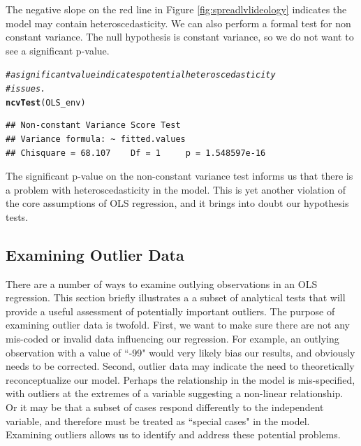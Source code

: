 \documentclass[11pt,openany]{book}\usepackage[]{graphicx}\usepackage[]{color}
\makeatletter
\newcommand{\hlcom}[1]{\textcolor[rgb]{0.678,0.584,0.686}{\textit{#1}}}%
\newcommand{\hlstd}[1]{\textcolor[rgb]{0.345,0.345,0.345}{#1}}%
\newcommand{\hlkwd}[1]{\textcolor[rgb]{0.737,0.353,0.396}{\textbf{#1}}}%
\newenvironment{kframe}{%
 \def\at@end@of@kframe{}%
 \ifinner\ifhmode%
  \def\at@end@of@kframe{\end{minipage}}%
  \begin{minipage}{\columnwidth}%
 \fi\fi%
 \def\FrameCommand##1{\hskip\@totalleftmargin \hskip-\fboxsep
 \colorbox{shadecolor}{##1}\hskip-\fboxsep
     \hskip-\linewidth \hskip-\@totalleftmargin \hskip\columnwidth}%
 \MakeFramed {\advance\hsize-\width
   \@totalleftmargin\z@ \linewidth\hsize
   \@setminipage}}%
 {\par\unskip\endMakeFramed%
 \at@end@of@kframe}
\newenvironment{knitrout}{}{} %
\renewenvironment{knitrout}{\begin{singlespace}}{\end{singlespace}}
\makeatother
\begin{document}
The negative slope on the red line in Figure \ref{fig:spreadlvlideology} indicates the model may contain heteroscedasticity.  We can also perform  a formal test for non constant variance.  The null hypothesis is constant variance, so we do not want to see a significant p-value.

\begin{knitrout}
\color{fgcolor}\begin{kframe}
\begin{alltt}
\hlcom{# a significant value indicates potential heteroscedasticity}
\hlcom{# issues.}
\hlkwd{ncvTest}\hlstd{(OLS_env)}
\end{alltt}
\begin{verbatim}
## Non-constant Variance Score Test 
## Variance formula: ~ fitted.values 
## Chisquare = 68.107    Df = 1     p = 1.548597e-16
\end{verbatim}
\end{kframe}
\end{knitrout}

The significant p-value on the non-constant variance test informs us that there is a problem with heteroscedasticity in the model.  This is yet another violation of the core assumptions of OLS regression, and it brings into doubt our hypothesis tests.

\subsection{Examining Outlier Data}

There are a number of ways to examine outlying observations in an OLS regression. This section briefly illustrates a a subset of analytical tests that will provide a useful assessment of potentially important outliers.  The purpose of examining outlier data is twofold.  First, we want to make sure there are not any mis-coded or invalid data influencing our regression. For example, an outlying observation with a value of ``-99" would very likely bias our results, and obviously needs to be  corrected. Second, outlier data may indicate the need to theoretically reconceptualize our model.  Perhaps the relationship in the model is mis-specified, with outliers at the extremes of a variable suggesting a non-linear relationship. Or it may be that a  subset of cases respond differently to the independent variable, and therefore must be treated as ``special cases" in the model. Examining outliers allows us to identify and address these potential problems.
\end{document}
